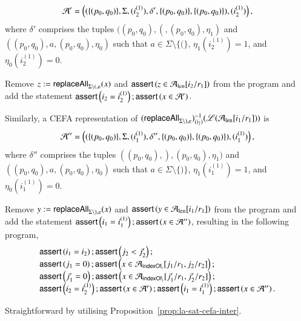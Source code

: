 {\begin{example}
\begin{description}
%
\[\mathcal{A}' = \left((\{(p_0, q_0)\}, \Sigma, (i^{(1)}_2), \delta', \{(p_0, q_0)\}, \{(p_0, q_0)\}), (i^{(1)}_2)\right),\]
%
where $\delta'$ comprises the tuples $((p_0,q_0), (, (p_0,q_0), \eta_1)$ and $((p_0,q_0), a, (p_0,q_0), \eta_0)$ such that $a \in \Sigma \setminus \{(\}$, $\eta_1(i^{(1)}_2)=1$, and $\eta_0(i^{(1)}_2)=0$. 

Remove  $z:= \mathsf{replaceAll}_{\Sigma \setminus (, \varepsilon}(x)$ and $\textsf{assert}\left(z \in \mathcal{A}_{\rm len}[i_2/r_1]\right)$ from the program and add the statement $\textsf{assert}\left(i_2=i^{(1)}_2\right);\textsf{assert}\left(x \in \mathcal{A}'\right)$. 

Similarly, a CEFA representation of $(\mathsf{replaceAll}_{\Sigma \setminus ), \varepsilon})^{-1}_{(i_2)}(\mathscr{L}(\mathcal{A}_{\rm len}[i_1/r_1]))$ is  
\[\mathcal{A}'' = \left((\{(p_0, q_0)\}, \Sigma, (i^{(1)}_1), \delta'', \{(p_0, q_0)\}, \{(p_0, q_0)\}), (i^{(1)}_1)\right),\]
%
where $\delta''$ comprises the tuples $((p_0,q_0), ), (p_0,q_0), \eta_1)$ and $((p_0,q_0), a, (p_0,q_0), \eta_0)$ such that $a \in \Sigma \setminus \{)\}$, $\eta_1(i^{(1)}_1)=1$, and $\eta_0(i^{(1)}_1)=0$. 

Remove  $y:= \mathsf{replaceAll}_{\Sigma \setminus ), \varepsilon}(x)$ and $\textsf{assert}\left(y \in \mathcal{A}_{\rm len}[i_1/r_1]\right)$ from the program and add the statement $\textsf{assert}\left(i_1=i^{(1)}_1\right); \textsf{assert}\left(x \in \mathcal{A}''\right)$, resulting in the following program,
\[
\begin{array}{l}
\textsf{assert}\left(i_1 = i_2\right); \textsf{assert}\left( j_2 < j'_2\right);\\
\textsf{assert}\left(j_1 = 0\right); \textsf{assert}\left(x \in \mathcal{A}_{\mathsf{indexOf}_{(}}[j_1/r_1, j_2/r_2]\right);  \\
\textsf{assert}\left(j'_1 = 0\right); \textsf{assert}\left(x \in \mathcal{A}_{\mathsf{indexOf}_{)}}[j'_1/r_1, j'_2/r_2]\right);\\
\textsf{assert}\left(i_2=i^{(1)}_2\right); \textsf{assert}\left(x \in \mathcal{A}'\right); \textsf{assert}\left(i_1=i^{(1)}_1\right); \textsf{assert}\left(x \in \mathcal{A}''\right).
\end{array}
\] 
%
\item[Step V.]  Straightforward by utilising Proposition~\ref{prop:la-sat-cefa-inter}. 
\end{description}

\end{example}
}



